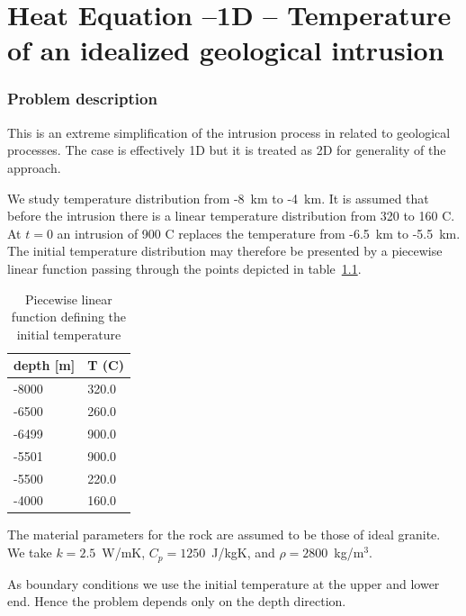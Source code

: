 \chapter{Heat Equation --1D -- Temperature of an idealized geological intrusion}



\subsection*{Problem description}

This is an extreme simplification of the intrusion process in 
related to geological processes. The case is effectively 1D but 
it is treated as 2D for generality of the approach. 

We study temperature distribution from -8~km to -4~km. It is assumed
that before the intrusion there is a linear temperature distribution
from 320 to 160 C. At $t=0$ an intrusion of 900 C replaces the 
temperature from -6.5~km to -5.5~km. The initial temperature distribution
may therefore be presented by a piecewise linear function passing through 
the points depicted in table~\ref{tb:inittemp}.

\begin{table}[h]
\caption{Piecewise linear function defining the initial temperature}
\label{tb:inittemp}
\begin{center}
\begin{tabular}{ll} \hline
depth [m] & T (C)    \\ \hline
-8000 & 320.0 \\
-6500 & 260.0 \\
-6499 & 900.0 \\
-5501 & 900.0 \\
-5500 & 220.0 \\
-4000 & 160.0 \\ \hline
\end{tabular}
\end{center}
\end{table}

The material parameters for the rock are assumed to be those of ideal granite. 
We take $k=2.5$~W/mK, $C_p=1250$~J/kgK, and $\rho=2800$~kg/m$^3$. 

As boundary conditions we use the initial temperature at the upper and lower end. Hence the problem depends only on the depth direction.


